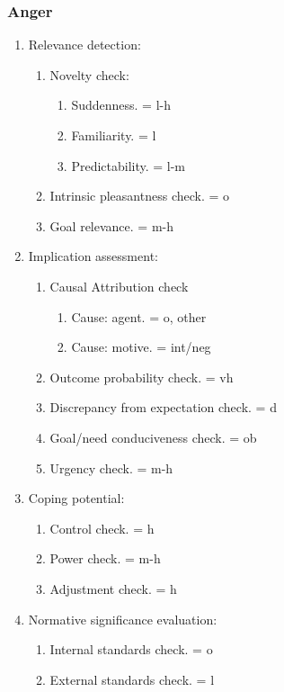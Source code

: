 \subsubsection{Anger}

\begin{enumerate}
 \item  Relevance detection:
 \begin{enumerate}
  \item  Novelty check:
  \begin{enumerate}
   \item  Suddenness. = l-h
   \item  Familiarity. = l
   \item  Predictability. = l-m
  \end{enumerate}
  \item  Intrinsic pleasantness check. = o
  \item  Goal relevance. = m-h
 \end{enumerate}
 \item  Implication assessment:
 \begin{enumerate}
  \item  Causal Attribution check
  \begin{enumerate}
   \item  Cause: agent. = o, other
   \item  Cause: motive. = int/neg
  \end{enumerate}
  \item  Outcome probability check. = vh
  \item  Discrepancy from expectation check. = d
  \item  Goal/need conduciveness check. = ob
  \item  Urgency check. = m-h
 \end{enumerate}
 \item  Coping potential:
 \begin{enumerate}
  \item  Control check. = h
  \item  Power check. = m-h
  \item  Adjustment check. = h
 \end{enumerate}
 \item  Normative significance evaluation:
 \begin{enumerate}
  \item  Internal standards check. = o
  \item  External standards check. = l
 \end{enumerate}
\end{enumerate}

